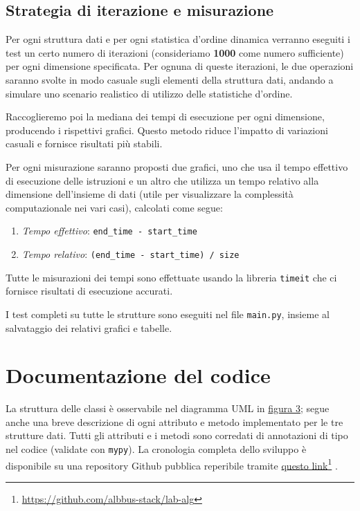 \documentclass[onecolumn]{article}
\newcommand\anchor[2]{%
  \href{#2}{#1}\footnote{\url{#2}}%
}
\begin{document}
\subsection{Strategia di iterazione e misurazione}

Per ogni struttura dati e per ogni statistica d'ordine dinamica verranno eseguiti i test un certo numero di iterazioni (consideriamo \textbf{1000} come numero sufficiente) per ogni dimensione specificata. Per ognuna di queste iterazioni, le due operazioni saranno svolte in modo casuale sugli elementi della struttura dati, andando a simulare uno scenario realistico di utilizzo delle statistiche d'ordine. 

Raccoglieremo poi la mediana dei tempi di esecuzione per ogni dimensione, producendo i rispettivi grafici. Questo metodo riduce l'impatto di variazioni casuali e fornisce risultati più stabili.

Per ogni misurazione saranno proposti due grafici, uno che usa il tempo effettivo di esecuzione delle istruzioni e un altro che utilizza un tempo relativo alla dimensione dell'insieme di dati (utile per visualizzare la complessità computazionale nei vari casi), calcolati come segue:
\begin{enumerate}
	\setlength\itemsep{-0.25em}
	\item \textit{Tempo effettivo}: \verb|end_time - start_time|
	\item \textit{Tempo relativo}: \verb|(end_time - start_time) / size|
\end{enumerate}

Tutte le misurazioni dei tempi sono effettuate usando la libreria \verb|timeit| che ci fornisce risultati di esecuzione accurati. 

I test completi su tutte le strutture sono eseguiti nel file \verb|main.py|, insieme al salvataggio dei relativi grafici e tabelle.

\newpage
\section{Documentazione del codice}

La struttura delle classi è osservabile nel diagramma UML in \hyperref[fig:classi]{figura 3}; segue anche una breve descrizione di ogni attributo e metodo implementato per le tre strutture dati. Tutti gli attributi e i metodi sono corredati di annotazioni di tipo nel codice (validate con \verb|mypy|). La cronologia completa dello sviluppo è disponibile su una repository Github pubblica reperibile tramite \anchor{questo link}{https://github.com/albbus-stack/lab-alg}. 
\end{document}
